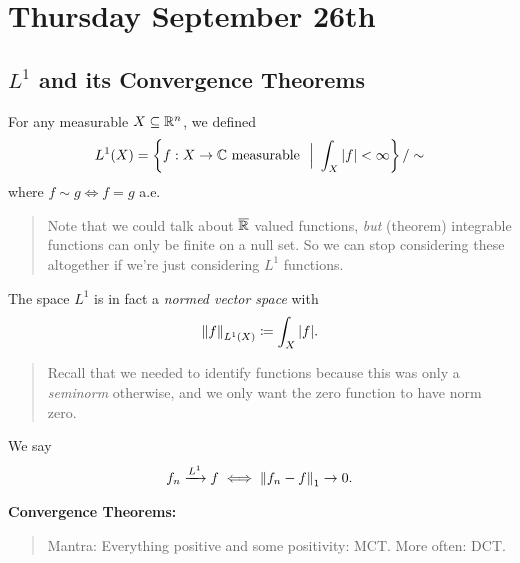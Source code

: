 \hypertarget{thursday-september-26th}{%
\section{Thursday September 26th}\label{thursday-september-26th}}

\hypertarget{l1-and-its-convergence-theorems}{%
\subsection{\texorpdfstring{\(L^1\) and its Convergence
Theorems}{L\^{}1 and its Convergence Theorems}}\label{l1-and-its-convergence-theorems}}

For any measurable \(X \subseteq {\mathbb{R}}^n\), we defined
\begin{align*}
L^1(X) = \left\{{f: X \to {\mathbb{C}} \text{ measurable } {~\mathrel{\Big|}~} \int_X {\left\lvert {f} \right\rvert} < \infty}\right\}/ \sim
\end{align*} where \(f\sim g \iff f = g\) a.e.

\begin{quote}
Note that we could talk about \(\overline {{\mathbb{R}}}\) valued functions,
\emph{but} (theorem) integrable functions can only be finite on a null
set. So we can stop considering these altogether if we're just
considering \(L^1\) functions.
\end{quote}

The space \(L^1\) is in fact a \emph{normed vector space} with
\begin{align*}
{\left\lVert {f} \right\rVert}_{L^1(X)} \coloneqq \int_X {\left\lvert {f} \right\rvert}
.\end{align*}

\begin{quote}
Recall that we needed to identify functions because this was only a
\emph{seminorm} otherwise, and we only want the zero function to have
norm zero.
\end{quote}

We say
\begin{align*}
f_n \xrightarrow{L^1} f \iff {\left\lVert {f_n - f} \right\rVert}_1 \to 0
.\end{align*}

\textbf{Convergence Theorems:}

\begin{quote}
Mantra: Everything positive and some positivity: MCT. More often: DCT.
\end{quote}

